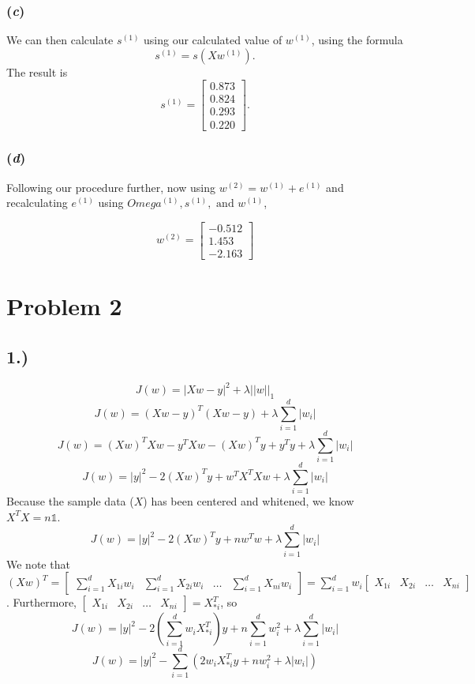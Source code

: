 \documentclass{report}
\begin{document}
\subsubsection*{(\textit{c})}

We can then calculate $s^{(1)}$ using our calculated value of $w^{(1)}$, using the formula 
$$ s^{(1)} = s(Xw^{(1)}) .$$
The result is 
$$ s^{(1)} = \begin{bmatrix} 0.873 \\ 0.824 \\ 0.293 \\ 0.220 \end{bmatrix} .$$


\subsubsection*{(\textit{d})}

Following our procedure further, now using $ w^{(2)} = w^{(1)} + e^{(1)} $ and recalculating $e^{(1)}$ using $Omega^{(1)}, s^{(1)}, \text{ and } w^{(1)}$,
 
$$ w^{(2)} = \begin{bmatrix} -0.512 \\ 1.453 \\ -2.163 \end{bmatrix} $$



\newpage
\section*{Problem 2}

\subsection*{1.)}

$$ J(w) = |Xw-y|^2 + \lambda ||w||_1 $$
$$ J(w) = (Xw-y)^T(Xw-y) + \lambda \sum_{i=1}^d{|w_i|} $$
$$ J(w) = (Xw)^TXw - y^TXw - (Xw)^Ty + y^Ty + \lambda \sum_{i=1}^d{|w_i|} $$
$$ J(w) = |y|^2 - 2(Xw)^Ty + w^TX^TXw + \lambda \sum_{i=1}^d{|w_i|} $$
Because the sample data ($X$) has been centered and whitened, we know $X^TX = n\mathbb{1}$. 
$$ J(w) = |y|^2 - 2(Xw)^Ty +  nw^Tw + \lambda \sum_{i=1}^d{|w_i|} $$
We note that $(Xw)^T = \begin{bmatrix} \sum_{i=1}^d{X_{1i}w_i} & \sum_{i=1}^d{X_{2i}w_i} & \hdots & \sum_{i=1}^d{X_{ni}w_i} \end{bmatrix} = \sum_{i=1}^d{w_i \begin{bmatrix} X_{1i} & X_{2i} & \hdots & X_{ni} \end{bmatrix}}$. Furthermore, $\begin{bmatrix} X_{1i} & X_{2i} & \hdots & X_{ni} \end{bmatrix} = X_{*i}^T$, so
$$ J(w) = |y|^2 - 2\left( \sum_{i=1}^d{w_i X_{*i}^T} \right) y +  n\sum_{i=1}^d{w_i^2} + \lambda \sum_{i=1}^d{|w_i|} $$
$$ J(w) = |y|^2 - \sum_{i=1}^d{\left( 2 w_i X_{*i}^T y +  n w_i^2 + \lambda |w_i| \right)} $$
\end{document}
